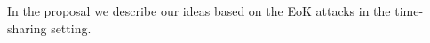 In the proposal we describe our ideas based on the EoK attacks in the time-sharing setting. 
%






